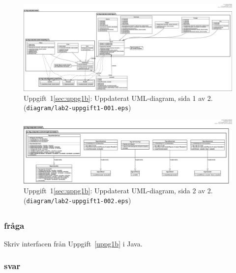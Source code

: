 \begin{figure}
\centering
\includegraphics[width=\linewidth]{diagram/lab2-uppgift1-001.eps}
\caption{Uppgift~1\ref{sec:uppg1b}: Uppdaterat UML-diagram, sida 1 av 2.
(\texttt{diagram/lab2-uppgift1-001.eps})}
\label{fig:uppg1b1}
\end{figure}

\begin{figure}
\centering
\includegraphics[width=\linewidth]{diagram/lab2-uppgift1-002.eps}
\caption{Uppgift~1\ref{sec:uppg1b}: Uppdaterat UML-diagram, sida 2 av 2.
(\texttt{diagram/lab2-uppgift1-002.eps})}
\label{fig:uppg1b2}
\end{figure}


\subsection{}
\subsubsection*{fråga}
Skriv interfacen från Uppgift~\ref{uppg1b} i Java.
\subsubsection*{svar}



